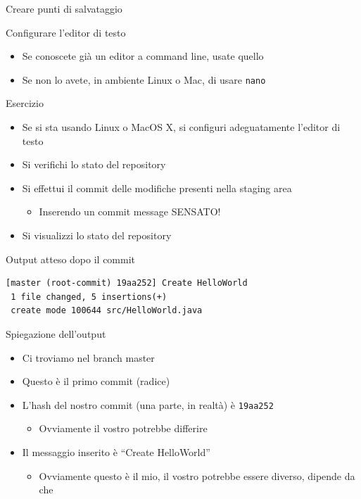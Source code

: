 \documentclass[xcolor=dvipsnames,presentation]{beamer}
\begin{document}
\begin{frame}{Creare punti di salvataggio}
\begin{block}{Configurare l'editor di testo}
\begin{itemize}
            \item Se conoscete già un editor a command line, usate quello
            \item Se non lo avete, in ambiente Linux o Mac, di usare \texttt{nano}
        \end{itemize}
    \end{block}
    \begin{block}{Esercizio}
        \begin{itemize}
            \item Se si sta usando Linux o MacOS X, si configuri adeguatamente l'editor di testo
            \item Si verifichi lo stato del repository
            \item Si effettui il commit delle modifiche presenti nella staging area
            \begin{itemize}
                \item Inserendo un commit message SENSATO!
            \end{itemize}
            \item Si visualizzi lo stato del repository
        \end{itemize}
    \end{block}
    \begin{block}{Output atteso dopo il commit}
        \begin{Verbatim}[fontsize=\scriptsize]
[master (root-commit) 19aa252] Create HelloWorld
 1 file changed, 5 insertions(+)
 create mode 100644 src/HelloWorld.java
\end{Verbatim}
    \end{block}
    \begin{block}{Spiegazione dell'output}
        \begin{itemize}
            \item Ci troviamo nel branch master
            \item Questo è il primo commit (radice)
            \item L'hash del nostro commit (una parte, in realtà) è \texttt{19aa252}
            \begin{itemize}
                \item Ovviamente il vostro potrebbe differire
            \end{itemize}
            \item Il messaggio inserito è ``Create HelloWorld''
            \begin{itemize}
                \item Ovviamente questo è il mio, il vostro potrebbe essere diverso, dipende da che

\end{itemize}
\end{itemize}
\end{block}
\end{frame}
\end{document}
